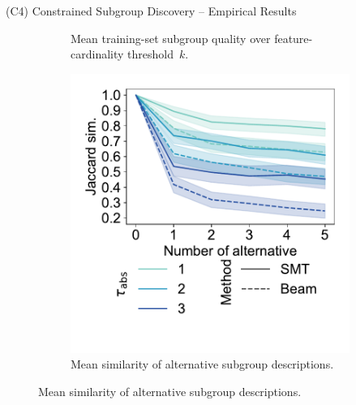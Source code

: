\documentclass[en, navbarinline, handout]{sdqbeamer}
\begin{document}
\begin{frame}[t]{(C4) Constrained Subgroup Discovery -- Empirical Results}
\begin{figure}
\begin{subfigure}[t]{0.32\textwidth}
			\caption*{Mean training-set subgroup quality over feature-cardinality threshold~$k$.}
		\end{subfigure}
		\hfill
		\pause
		\begin{subfigure}[t]{0.32\textwidth}
			\centering
			\includegraphics[width=\textwidth, trim={15 50 15 15}, clip]{plots/csd-alternatives-jaccard.pdf}
			\caption*{Mean similarity of alternative subgroup descriptions.}
		\end{subfigure}
	\end{figure}
\end{frame}
\end{document}
